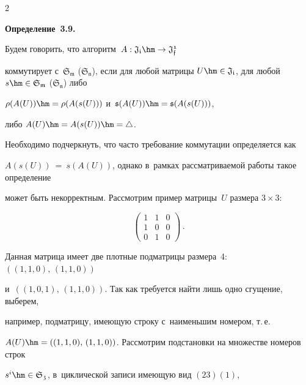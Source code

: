 \begin{multicols}{2}
\smallskip





\noindent


\textbf{Определение~3.9.}\


Будем говорить, что алгоритм~$A: \mathfrak{J_i} \hm\rightarrow \mathfrak{J_f^1}$ 


коммутирует с~$\mathfrak{S_m}$ ($\mathfrak{S_n}$), если для любой матрицы $U \hm\in 


\mathfrak{J_i}$, для любой $s \hm\in \mathfrak{S_m}$ ($\mathfrak{S_n}$) либо 


$\rho(A(U))\hm=\rho(A(s(U)))$ и~$\mathfrak{s}(A(U)) \hm= \mathfrak{s}(A(s(U)))$, 


либо $A(U)\hm=A(s(U))\hm=\triangle$.





\smallskip





Необходимо подчеркнуть, что часто требование коммутации определяется как 


$A(s(U))~=~s(A(U))$, однако в~рамках рассматриваемой работы такое определение 


может быть некорректным. Рас\-смот\-рим пример матрицы~$U$ размера $3\times 3$:


$$


\begin{pmatrix}


 1 & 1 & 0\\ 


 1 & 0 & 0


  \\  0 & 1 & 0


  \end{pmatrix}\,.


  $$





Данная матрица имеет две плотные подматрицы размера~4: $((1,1,0),\, (1,1,0))$ 


и~$((1,0,1),\, (1,1,0))$. Так как требуется найти лишь одно сгущение, выберем, 


например, подматрицу, имеющую строку с~наименьшим номером, т.\,е.\ 


$A(U)\hm=((1,1,0),\, (1,1,0))$. Рассмотрим подстановки на множестве номеров строк 


$s^i \hm\in \mathfrak{S_3}$, в~циклической записи имеющую вид $(23)(1)$, 



\end{multicols}
